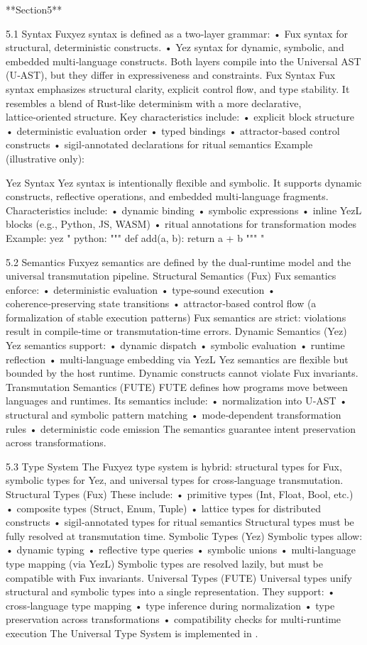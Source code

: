 **Section5**

5.1 Syntax
Fuxyez syntax is defined as a two‑layer grammar:
• 	Fux syntax for structural, deterministic constructs.
• 	Yez syntax for dynamic, symbolic, and embedded multi‑language constructs.
Both layers compile into the Universal AST (U‑AST), but they differ in expressiveness and constraints.
Fux Syntax
Fux syntax emphasizes structural clarity, explicit control flow, and type stability. It resembles a blend of Rust‑like determinism with a more declarative, lattice‑oriented structure.
Key characteristics include:
• 	explicit block structure
• 	deterministic evaluation order
• 	typed bindings
• 	attractor‑based control constructs
• 	sigil‑annotated declarations for ritual semantics
Example (illustrative only):

Yez Syntax
Yez syntax is intentionally flexible and symbolic. It supports dynamic constructs, reflective operations, and embedded multi‑language fragments.
Characteristics include:
• 	dynamic binding
• 	symbolic expressions
• 	inline YezL blocks (e.g., Python, JS, WASM)
• 	ritual annotations for transformation modes
Example:
yez "
    python: """
    def add(a, b): return a + b
    """
"

5.2 Semantics
Fuxyez semantics are defined by the dual‑runtime model and the universal transmutation pipeline.
Structural Semantics (Fux)
Fux semantics enforce:
• 	deterministic evaluation
• 	type‑sound execution
• 	coherence‑preserving state transitions
• 	attractor‑based control flow (a formalization of stable execution patterns)
Fux semantics are strict: violations result in compile‑time or transmutation‑time errors.
Dynamic Semantics (Yez)
Yez semantics support:
• 	dynamic dispatch
• 	symbolic evaluation
• 	runtime reflection
• 	multi‑language embedding via YezL
Yez semantics are flexible but bounded by the host runtime. Dynamic constructs cannot violate Fux invariants.
Transmutation Semantics (FUTE)
FUTE defines how programs move between languages and runtimes. Its semantics include:
• 	normalization into U‑AST
• 	structural and symbolic pattern matching
• 	mode‑dependent transformation rules
• 	deterministic code emission
The semantics guarantee intent preservation across transformations.

5.3 Type System
The Fuxyez type system is hybrid: structural types for Fux, symbolic types for Yez, and universal types for cross‑language transmutation.
Structural Types (Fux)
These include:
• 	primitive types (Int, Float, Bool, etc.)
• 	composite types (Struct, Enum, Tuple)
• 	lattice types for distributed constructs
• 	sigil‑annotated types for ritual semantics
Structural types must be fully resolved at transmutation time.
Symbolic Types (Yez)
Symbolic types allow:
• 	dynamic typing
• 	reflective type queries
• 	symbolic unions
• 	multi‑language type mapping (via YezL)
Symbolic types are resolved lazily, but must be compatible with Fux invariants.
Universal Types (FUTE)
Universal types unify structural and symbolic types into a single representation. They support:
• 	cross‑language type mapping
• 	type inference during normalization
• 	type preservation across transformations
• 	compatibility checks for multi‑runtime execution
The Universal Type System is implemented in .

